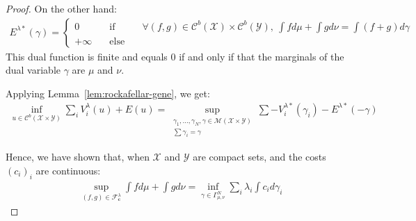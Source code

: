 \begin{proof}
On  the other hand:
\begin{align*}
E^{\lambda*}(\gamma)=\left\{\begin{matrix} 0 &\quad\text{if}\quad& \forall (f,g)\in \mathcal{C}^b(\mathcal{X})\times \mathcal{C}^b(\mathcal{Y}),~ \int fd\mu+\int gd\nu  = \int (f+g)d\gamma\\
+\infty &\quad\text{else}\quad&\end{matrix}\right.
\end{align*}
This dual function is finite and equals $0$ if and only if that the marginals of the dual variable $\gamma$ are $\mu$ and $\nu$. 

Applying Lemma~\ref{lem:rockafellar-gene}, we get:
\begin{align*}
\inf_{u\in \mathcal{C}^b(\mathcal{X}\times\mathcal{Y})} \sum_i V^{\lambda}_i(u)+E(u) = \sup\limits_{\substack{\gamma_1,...,\gamma_N,\gamma\in \mathcal{M}(\mathcal{X}\times\mathcal{Y})\\\sum\gamma_i=\gamma}}\sum -V^{\lambda*}_i(\gamma_i)-E^{\lambda*}(-\gamma)
\end{align*}



Hence, we  have shown that, when $\mathcal{X}$ and $\mathcal{Y}$ are compact sets, and  the costs $(c_i)_i$ are continuous:
\begin{align*}
\sup\limits_{(f,g)\in\mathcal{F}^\lambda_\mathbf{c}}\int fd\mu+\int gd\nu = \inf\limits_{\gamma\in\Gamma^N_{\mu,\nu}}\sum_i\lambda_i \int c_id\gamma_i
\end{align*}




\end{proof}
